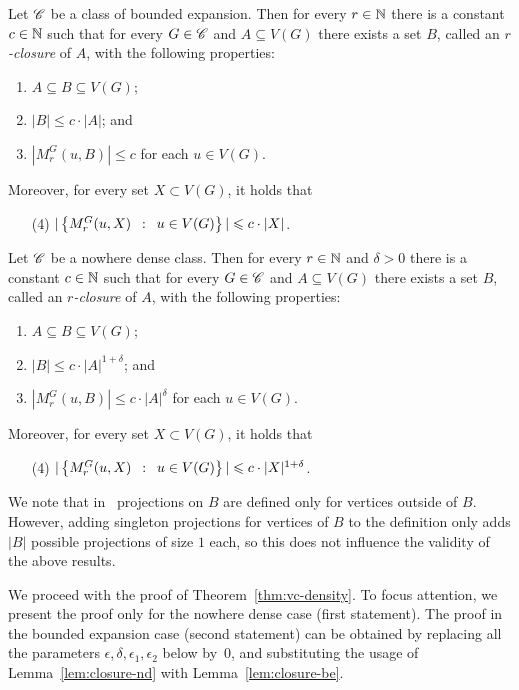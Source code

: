 \begin{lemma}\label{lem:closure-be}
Let $\mathscr{C}$ be a class of bounded expansion. 
Then for every $r\in \mathbb{N}$ there is a constant $c\in \mathbb{N}$ such that for
every $G\in \mathscr{C}$ and $A\subseteq V(G)$ there exists a set $B$, called an {\em{$r$-closure}} of $A$, with the following properties:
\begin{enumerate}
  \item $A\subseteq B\subseteq V(G)$;
  \item $|B|\leq c\cdot |A|$; and
  \item $|M_r^G(u,B)|\leq c$ for each $u\in V(G)$.
  \end{enumerate}
  Moreover, for every set $X\subset V(G)$, it holds that
  \begin{enumerate}
  \item[(4)] $|\left\{M_r^G(u,X) \,~:~\, u\in V(G) \right\}|\leqslant c\cdot |X|$.
\end{enumerate}
\end{lemma}

\begin{lemma}\label{lem:closure-nd}
Let $\mathscr{C}$ be a nowhere dense class. 
Then for every $r\in\mathbb{N}$ and $\delta>0$ there is a 
constant $c\in\mathbb{N}$ such that for every $G\in \mathscr{C}$ and $A\subseteq V(G)$ there exists a set 
$B$,  called an {\em{$r$-closure}} of $A$, 
with the following properties: 
\begin{enumerate}
  \item $A\subseteq B\subseteq V(G)$;
  \item $|B|\leq c\cdot |A|^{1+\delta}$; and
  \item $|M_r^G(u,B)|\leq c\cdot |A|^{\delta}$ for each $u\in V(G)$.
  \end{enumerate}
  Moreover, for every set $X\subset V(G)$, it holds that
  \begin{enumerate}
  \item[(4)] $|\left\{M_r^G(u,X) \,~:~\, u\in V(G) \right\}|\leqslant c\cdot |X|^{1+\delta}$.
\end{enumerate}
\end{lemma}

We note that in~\cite{drange2016kernelization,eickmeyer2016neighborhood} projections on $B$ are defined only for vertices outside of $B$. 
However, adding singleton projections for vertices of $B$ to the definition only adds $|B|$ possible projections of size $1$ each, so this does not influence the validity of the above results.


We proceed with the proof of Theorem~\ref{thm:vc-density}.
 To focus attention, we present the proof only for the nowhere dense case (first statement). The proof in the bounded expansion case (second statement)
 can be obtained by replacing all the parameters $\epsilon,\delta,\epsilon_1,\epsilon_2$ below by~$0$, and substituting the usage of Lemma~\ref{lem:closure-nd} with Lemma~\ref{lem:closure-be}.


